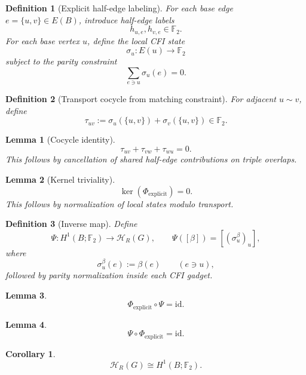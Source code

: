 \documentclass[11pt]{article}
\newtheorem{definition}{Definition}
\newtheorem{lemma}{Lemma}
\newtheorem{corollary}{Corollary}
\begin{document}
\begin{definition}[Explicit half-edge labeling]
For each base edge $e=\{u,v\}\in E(B)$, introduce half-edge labels
\[
h_{u,e},h_{v,e}\in\mathbb F_2.
\]
For each base vertex $u$, define the local CFI state
\[
\sigma_u:E(u)\to\mathbb F_2
\]
subject to the parity constraint
\[
\sum_{e\ni u}\sigma_u(e)=0.
\]
\end{definition}

\begin{definition}[Transport cocycle from matching constraint]
For adjacent $u\sim v$, define
\[
\tau_{uv}:=\sigma_u(\{u,v\})+\sigma_v(\{u,v\})\in\mathbb F_2.
\]
\end{definition}

\begin{lemma}[Cocycle identity]
\[
\tau_{uv}+\tau_{vw}+\tau_{wu}=0.
\]
This follows by cancellation of shared half-edge contributions on triple overlaps.
\end{lemma}

\begin{lemma}[Kernel triviality]
\[
\ker(\Phi_{\mathrm{explicit}})=0.
\]
This follows by normalization of local states modulo transport.
\end{lemma}

\begin{definition}[Inverse map]
Define
\[
\Psi:H^1(B;\mathbb F_2)\to \mathcal H_R(G),
\qquad
\Psi([\beta])=[(\sigma_u^\beta)_u],
\]
where
\[
\sigma_u^\beta(e):=\beta(e)\qquad (e\ni u),
\]
followed by parity normalization inside each CFI gadget.
\end{definition}

\begin{lemma}
\[
\Phi_{\mathrm{explicit}}\circ\Psi=\mathrm{id}.
\]
\end{lemma}

\begin{lemma}
\[
\Psi\circ\Phi_{\mathrm{explicit}}=\mathrm{id}.
\]
\end{lemma}

\begin{corollary}
\[
\mathcal H_R(G)\cong H^1(B;\mathbb F_2).
\]
\end{corollary}
\end{document}
